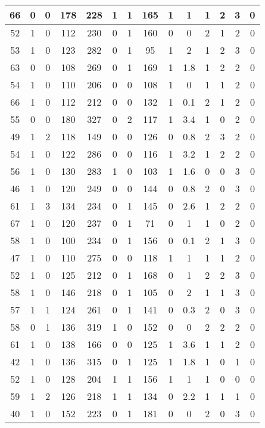 \documentclass{article}
\begin{document}
\begin{longtable}{|c|c|c|c|c|c|c|c|c|c|c|c|c|c|}
66 & 0 & 0 & 178 & 228 & 1 & 1 & 165 & 1 & 1 & 1 & 2 & 3 & 0\\ \hline
52 & 1 & 0 & 112 & 230 & 0 & 1 & 160 & 0 & 0 & 2 & 1 & 2 & 0\\ \hline
53 & 1 & 0 & 123 & 282 & 0 & 1 & 95 & 1 & 2 & 1 & 2 & 3 & 0\\ \hline
63 & 0 & 0 & 108 & 269 & 0 & 1 & 169 & 1 & 1.8 & 1 & 2 & 2 & 0\\ \hline
54 & 1 & 0 & 110 & 206 & 0 & 0 & 108 & 1 & 0 & 1 & 1 & 2 & 0\\ \hline
66 & 1 & 0 & 112 & 212 & 0 & 0 & 132 & 1 & 0.1 & 2 & 1 & 2 & 0\\ \hline
55 & 0 & 0 & 180 & 327 & 0 & 2 & 117 & 1 & 3.4 & 1 & 0 & 2 & 0\\ \hline
49 & 1 & 2 & 118 & 149 & 0 & 0 & 126 & 0 & 0.8 & 2 & 3 & 2 & 0\\ \hline
54 & 1 & 0 & 122 & 286 & 0 & 0 & 116 & 1 & 3.2 & 1 & 2 & 2 & 0\\ \hline
56 & 1 & 0 & 130 & 283 & 1 & 0 & 103 & 1 & 1.6 & 0 & 0 & 3 & 0\\ \hline
46 & 1 & 0 & 120 & 249 & 0 & 0 & 144 & 0 & 0.8 & 2 & 0 & 3 & 0\\ \hline
61 & 1 & 3 & 134 & 234 & 0 & 1 & 145 & 0 & 2.6 & 1 & 2 & 2 & 0\\ \hline
67 & 1 & 0 & 120 & 237 & 0 & 1 & 71 & 0 & 1 & 1 & 0 & 2 & 0\\ \hline
58 & 1 & 0 & 100 & 234 & 0 & 1 & 156 & 0 & 0.1 & 2 & 1 & 3 & 0\\ \hline
47 & 1 & 0 & 110 & 275 & 0 & 0 & 118 & 1 & 1 & 1 & 1 & 2 & 0\\ \hline
52 & 1 & 0 & 125 & 212 & 0 & 1 & 168 & 0 & 1 & 2 & 2 & 3 & 0\\ \hline
58 & 1 & 0 & 146 & 218 & 0 & 1 & 105 & 0 & 2 & 1 & 1 & 3 & 0\\ \hline
57 & 1 & 1 & 124 & 261 & 0 & 1 & 141 & 0 & 0.3 & 2 & 0 & 3 & 0\\ \hline
58 & 0 & 1 & 136 & 319 & 1 & 0 & 152 & 0 & 0 & 2 & 2 & 2 & 0\\ \hline
61 & 1 & 0 & 138 & 166 & 0 & 0 & 125 & 1 & 3.6 & 1 & 1 & 2 & 0\\ \hline
42 & 1 & 0 & 136 & 315 & 0 & 1 & 125 & 1 & 1.8 & 1 & 0 & 1 & 0\\ \hline
52 & 1 & 0 & 128 & 204 & 1 & 1 & 156 & 1 & 1 & 1 & 0 & 0 & 0\\ \hline
59 & 1 & 2 & 126 & 218 & 1 & 1 & 134 & 0 & 2.2 & 1 & 1 & 1 & 0\\ \hline
40 & 1 & 0 & 152 & 223 & 0 & 1 & 181 & 0 & 0 & 2 & 0 & 3 & 0\\ \hline

\end{longtable}
\end{document}
